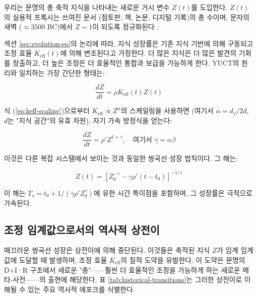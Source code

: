 \documentclass[12pt,a4paper]{article}
\newcommand{\df}{d_{\!f}}
\theoremstyle{remark}
\begin{document}
	우리는 문명의 총 축적 지식을 나타내는 새로운 거시 변수 \(Z(t)\)를 도입한다. \(Z(t)\)의 실용적 프록시는 쓰여진 문서 (점토판, 책, 논문, 디지털 기록)의 총 수이며, 문자의 새벽 (\(\approx 3500\) BC)에서 \(Z=1\)이 되도록 정규화된다 \cite{Buringh2009, Desai2026}.
	
	섹션 \ref{sec:evolution-eq}의 논리에 따라, 지식 성장률은 기존 지식 기반에 의해 구동되고 조정 효율 \(K_{\text{eff}}(t)\)에 의해 변조된다고 가정한다. 더 많은 지식은 더 많은 발견의 기회를 창출하고, 더 높은 조정은 더 효율적인 통합과 보급을 가능하게 한다. YUCT의 원리와 일치하는 가장 간단한 형태는:
	
	\begin{equation}
		\frac{dZ}{dt} = \rho K_{\text{eff}}(t) Z(t)
		\label{eq:Z-growth}
	\end{equation}
	
	식 (\ref{eq:keff-scaling})으로부터 \(K_{\text{eff}} \propto Z^{\alpha}\)의 스케일링을 사용하면 (여기서 \(\alpha = \df/2d\), \(d\)는 "지식 공간"의 유효 차원), 자기 가속 방정식을 얻는다:
	
	\begin{equation}
		\frac{dZ}{dt} = \rho' Z^{1+\gamma}, \quad \text{여기서 } \gamma = \alpha \beta
		\label{eq:Z-self-accel}
	\end{equation}
	
	이것은 다른 복잡 시스템에서 보이는 것과 동일한 쌍곡선 성장 법칙이다. 그 해는:
	
	\begin{equation}
		Z(t) = \left[ Z_0^{-\gamma} - \gamma \rho' (t - t_0) \right]^{-1/\gamma}
		\label{eq:Z-hyperbolic}
	\end{equation}
	
	이 해는 \(T_s = t_0 + 1/(\gamma \rho' Z_0^{\gamma})\)에 유한 시간 특이점을 포함하며, 그 성장률은 극적으로 가속된다.
	
	\subsection{조정 임계값으로서의 역사적 상전이}
	
	매끄러운 쌍곡선 성장은 상전이에 의해 중단된다. 이것들은 축적된 지식 \(Z\)가 임계 임계값에 도달할 때 발생하며, 조정 효율 \(K_{\text{eff}}\)의 질적 도약을 유발한다. 이 도약은 문명의 D+I·R 구조에서 새로운 "층"——훨씬 더 효율적인 조정을 가능하게 하는 새로운 메타-사전——의 출현에 해당한다. 표 \ref{tab:historical-transitions}는 그러한 상전이로 이해될 수 있는 주요 역사적 에포크를 식별한다.
	
\end{document}
